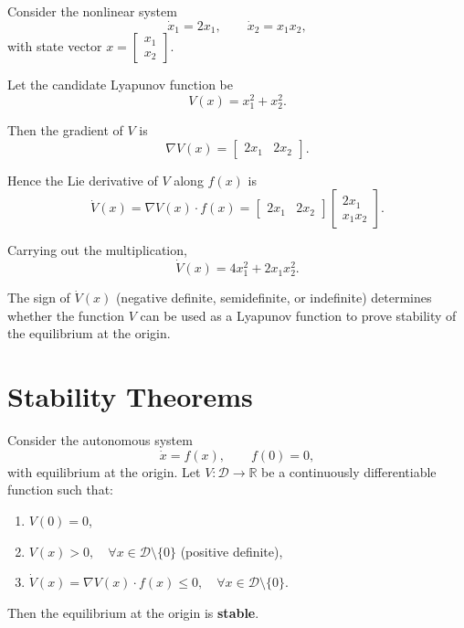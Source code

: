 \begin{example}
Consider the nonlinear system
\[
    \dot{x}_1 = 2x_1, 
    \qquad 
    \dot{x}_2 = x_1x_2,
\]
with state vector $x = \begin{bmatrix}x_1 \\ x_2\end{bmatrix}$.

Let the candidate Lyapunov function be
\[
    V(x) = x_1^2 + x_2^2.
\]

Then the gradient of $V$ is
\[
    \nabla V(x) = \begin{bmatrix} 2x_1 & 2x_2 \end{bmatrix}.
\]

Hence the Lie derivative of $V$ along $f(x)$ is
\[
    \dot{V}(x) = \nabla V(x)\cdot f(x) 
    = \begin{bmatrix} 2x_1 & 2x_2 \end{bmatrix}
      \begin{bmatrix} 2x_1 \\ x_1x_2 \end{bmatrix}.
\]

Carrying out the multiplication,
\[
    \dot{V}(x) = 4x_1^2 + 2x_1x_2^2.
\]

\end{example}

\begin{remark}
The sign of $\dot{V}(x)$ (negative definite, semidefinite, or indefinite) determines whether the function $V$ can be used as a Lyapunov function to prove stability of the equilibrium at the origin.
\end{remark}

\section{Stability Theorems}

\begin{theorem}
Consider the autonomous system
\[
    \dot{x} = f(x), \qquad f(0)=0,
\]
with equilibrium at the origin.  
Let $V:\mathcal{D}\to \mathbb{R}$ be a continuously differentiable function such that:
\begin{enumerate}
    \item $V(0) = 0$,
    \item $V(x) > 0, \quad \forall x \in \mathcal{D}\setminus\{0\}$ (positive definite),
    \item $\dot V(x) = \nabla V(x)\cdot f(x) \leq 0, \quad \forall x \in \mathcal{D}\setminus\{0\}$.
\end{enumerate}
Then the equilibrium at the origin is \textbf{stable}.
\end{theorem}

